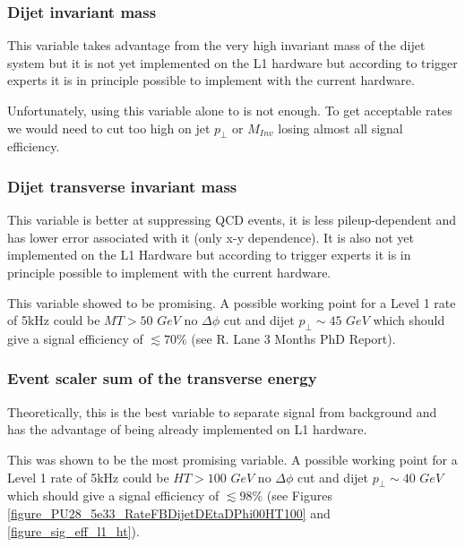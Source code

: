 \subsubsection{Dijet invariant mass}

This variable takes advantage from the very high invariant mass of the dijet system but it is not yet implemented
on the L1 hardware but according to trigger experts it is in principle possible to implement with the current hardware.

Unfortunately, using this variable alone to is not enough. To get acceptable rates we would need to cut too high on
jet $p_\bot$ or $M_{Inv}$ losing almost all signal efficiency.

\subsubsection{Dijet transverse invariant mass}

This variable is better at suppressing QCD events, it is less pileup-dependent and has lower error associated with it
(only x-y dependence). It is also not yet implemented on the L1 Hardware but according to trigger experts it is in principle 
possible to implement with the current hardware.

This variable showed to be promising. A possible working point for a Level 1 rate
of 5kHz could be $MT>50$ $GeV$ no $\Delta\phi$ cut and dijet $p_\bot \sim 45$ $GeV$ which should give a signal
efficiency of $\lesssim70\%$ (see R. Lane 3 Months PhD Report).

\subsubsection{Event scaler sum of the transverse energy}

Theoretically, this is the best variable to separate signal from background and has the advantage of being already
implemented on L1 hardware.

This was shown to be the most promising variable. A possible working point for a Level 1 rate of 5kHz could be $HT>100$ 
$GeV$ no $\Delta\phi$ cut and dijet $p_\bot \sim 40$ $GeV$ which should give a signal efficiency of $\lesssim98\%$
(see Figures \ref{figure_PU28_5e33_RateFBDijetDEtaDPhi00HT100} and \ref{figure_sig_eff_l1_ht}).

